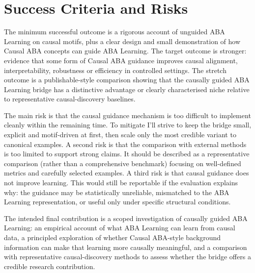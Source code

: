 \section{Success Criteria and Risks}
\label{sec:project-plan-success-risks}

The minimum successful outcome is a rigorous account of unguided ABA Learning on causal motifs, plus a clear design and small demonstration of how Causal ABA concepts can guide ABA Learning. The target outcome is stronger: evidence that some form of Causal ABA guidance improves causal alignment, interpretability, robustness or efficiency in controlled settings. The stretch outcome is a publishable-style comparison showing that the causally guided ABA Learning bridge has a distinctive advantage or clearly characterised niche relative to representative causal-discovery baselines.

The main risk is that the causal guidance mechanism is too difficult to implement cleanly within the remaining time. To mitigate I'll strive to keep the bridge small, explicit and motif-driven at first, then scale only the most credible variant to canonical examples. A second risk is that the comparison with external methods is too limited to support strong claims. It should be described as a representative comparison (rather than a comprehensive benchmark) focusing on well-defined metrics and carefully selected examples. A third risk is that causal guidance does not improve learning. This would still be reportable if the evaluation explains why: the guidance may be statistically unreliable, mismatched to the ABA Learning representation, or useful only under specific structural conditions.

The intended final contribution is a scoped investigation of causally guided ABA Learning: an empirical account of what ABA Learning can learn from causal data, a principled exploration of whether Causal ABA-style background information can make that learning more causally meaningful, and a comparison with representative causal-discovery methods to assess whether the bridge offers a credible research contribution.
